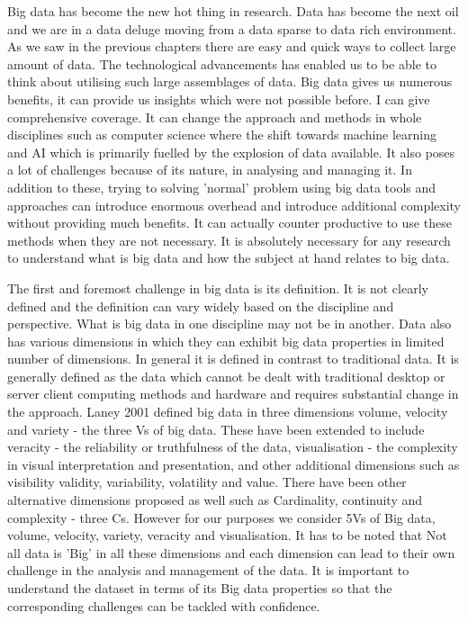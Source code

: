 Big data has become the new hot thing in research.
Data has become the next oil and we are in a data deluge moving from a data sparse to data rich environment.
As we saw in the previous chapters there are easy and quick ways to collect large amount of data.
The technological advancements has enabled us to be able to think about utilising such large assemblages of data.
Big data gives us numerous benefits, it can provide us insights which were not possible before.
I can give comprehensive coverage.
It can change the approach and methods in whole disciplines such as computer science where the shift towards machine learning and AI which is primarily fuelled by the explosion of data available.
It also poses a lot of challenges because of its nature, in analysing and managing it.
In addition to these, trying to solving 'normal' problem using big data tools and approaches can introduce enormous overhead and introduce additional complexity without providing much benefits.
It can actually counter productive to use these methods when they are not necessary.
It is absolutely necessary for any research to understand what is big data and how the subject at hand relates to big data.

The first and foremost challenge in big data is its definition.
It is not clearly defined and the definition can vary widely based on the discipline and perspective.
What is big data in one discipline may not be in another.
Data also has various dimensions in which they can exhibit big data properties in limited number of dimensions.
In general it is defined in contrast to traditional data.
It is generally defined as the data which cannot be dealt with traditional desktop or server client computing methods and hardware and requires substantial change in the approach.
Laney 2001 defined big data in three dimensions volume, velocity and variety - the three Vs of big data.
These have been extended to include veracity - the reliability or truthfulness of the data, visualisation - the complexity in visual interpretation and presentation, and other additional dimensions such as visibility validity, variability, volatility and value.
There have been other alternative dimensions proposed as well such as Cardinality, continuity and complexity - three Cs.
However for our purposes we consider 5Vs of Big data, volume, velocity, variety, veracity and visualisation.
It has to be noted that Not all data is 'Big' in all these dimensions and each dimension can lead to their own challenge in the analysis and management of the data.
It is important to understand the dataset in terms of its Big data properties so that the corresponding challenges can be tackled with confidence.

